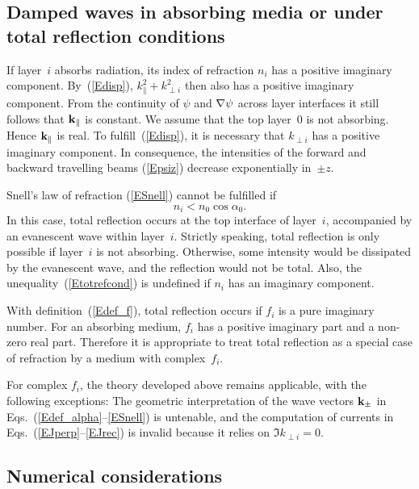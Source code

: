 \subsection{Damped waves in absorbing media
  or under total reflection conditions}\label{s:complex}

If layer~$i$ absorbs radiation,
its index of refraction $n_i$ has a positive imaginary component.
By~(\ref{Edisp}),
$k_\parallel^2+k_{\perp i}^2$ then also has a positive imaginary component.
From the continuity of $\psi$ and $\mathbf{\nabla}\psi$ across layer interfaces
it still follows that $\mathbf{k}_\parallel$ is constant.
We assume that the top layer~0 is not absorbing.
Hence $\mathbf{k}_\parallel$ is real.
To fulfill~(\ref{Edisp}),
it is necessary that $k_{\perp i}$
has a positive imaginary component.
In consequence,
the intensities of the forward and backward travelling beams (\ref{Epsiz})
decrease exponentially in~$\pm z$.

Snell's law of refraction (\ref{ESnell})
cannot be fulfilled if
\begin{equation}\label{Etotrefcond}
  n_i<n_0\cos\alpha_0.  
\end{equation}
In this case, total reflection occurs at the top interface of layer~$i$,
accompanied by an evanescent wave within layer~$i$.
Strictly speaking,
total reflection is only possible if layer~$i$ is not absorbing.
Otherwise, some intensity would be dissipated by the evanescent wave,
and the reflection would not be total.
Also, the unequality~(\ref{Etotrefcond}) is undefined
if $n_i$ has an imaginary component.

With definition~(\ref{Edef_f}),
total reflection occurs if $f_i$ is a pure imaginary number.
For an absorbing medium, $f_i$ has a positive imaginary part
and a non-zero real part.
Therefore it is appropriate to treat total reflection as a special
case of refraction by a medium with complex~$f_i$.

For complex $f_i$,
the theory developed above
remains applicable, with the following exceptions:
The geometric interpretation of the wave vectors $\mathbf{k}_\pm$
in Eqs.~(\ref{Edef_alpha}--\ref{ESnell}) is untenable,
and the computation of currents in
Eqs.~(\ref{EJperp}--\ref{EJrec}) is invalid because it
relies on $\Im k_{\perp i}=0$.


\subsection{Numerical considerations}

